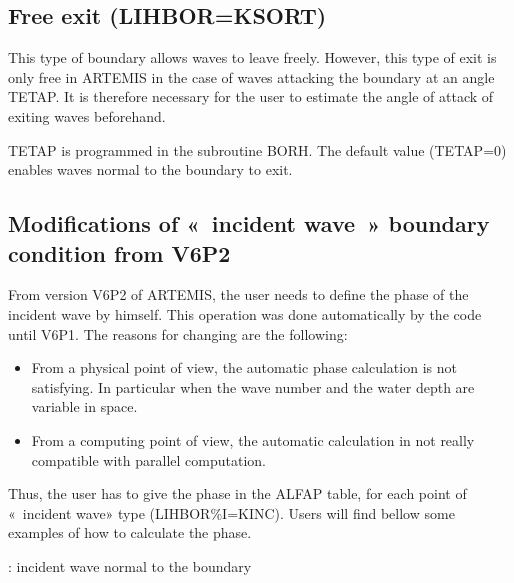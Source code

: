 \subsection{Free exit (LIHBOR=KSORT)}

This type of boundary allows waves to leave freely. However, this type of exit
is only free in ARTEMIS in the case of waves attacking the boundary at an angle
TETAP\@. It is therefore necessary for the user to estimate the angle of attack
of exiting waves beforehand.

TETAP is programmed in the subroutine BORH\@. The default value (TETAP=0) enables
waves normal to the boundary to exit.

\subsection{Modifications of «~incident wave~» boundary condition from V6P2}

From version V6P2 of ARTEMIS, the user needs to define the phase of the incident wave by himself. This operation was done automatically by the code until V6P1. The reasons for changing are the following:

\begin{itemize}
\item  From a physical point of view, the automatic phase calculation is not satisfying. In particular when the wave number and the water depth are variable in space.

\item  From a computing point of view, the automatic calculation in not really compatible with parallel computation.
\end{itemize}

Thus, the user has to give the phase in the ALFAP table, for each point of «~incident wave» type (LIHBOR\%I=KINC). Users will find bellow some examples of how to calculate the phase.

: incident wave normal to the boundary

